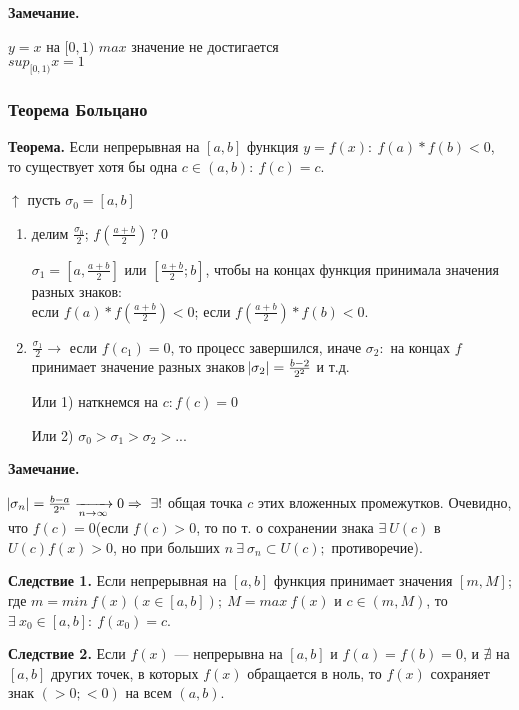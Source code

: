 \documentclass{article}
\begin{document}
    \textbf{Замечание.} 

    \( y = x \) на \( [0, 1) \) \( max \) значение не достигается\\
    \( sup_{[0, 1)} x = 1 \)


    \subsubsection{Теорема Больцано}
    \textbf{Теорема.} Если непрерывная на \([a, b]\) функция \(y = f(x):\ f(a) * f(b) < 0\), то существует хотя бы одна \(c \in (a, b):\ f(c) = c\).

    \( \uparrow \) пусть \( \sigma_0 = [a, b] \)

    \begin{enumerate}
        \item делим \( \frac{\sigma_0}{2} \); \( f(\frac{a + b}{2})\ ?\ 0 \)
        
        \( \sigma_1 = [a, \frac{a + b}{2}] \) или \( [\frac{a + b}{2}; b] \), чтобы на концах функция принимала значения разных знаков:\\
        если \(f(a)*f(\frac{a+b}{2}) < 0\); если \(f(\frac{a+b}{2}) * f(b) < 0\).
        
        \item \( \frac{\sigma_1}{2} \rightarrow \) если \(f(c_1) = 0\), то процесс завершился, иначе \(\sigma_2:\) на концах \(f\) принимает значение разных знаков \( \abs{\sigma_2} = \frac{b - 2}{2^2} \) и т.д. 
        
        Или 1) наткнемся на \( c: f(c) = 0 \)
        
        Или 2) \( \sigma_0 > \sigma_1 > \sigma_2 > ... \)
    \end{enumerate}
    
    \textbf{Замечание.}

    \(\abs{\sigma_n} = \frac{b-a}{2^n} \xrightarrow[n \rightarrow \infty]{} 0 \Rightarrow\ \exists !\) общая точка \(c\) этих вложенных промежутков. Очевидно, что \(f(c) = 0\)(если \(f(c) > 0\), то по т. о сохранении знака \(\exists\ U(c)\) в \(U(c) f(x) > 0\), но при больших \(n\ \exists\ \sigma_n \subset U(c);\) противоречие).

    \textbf{Следствие 1.} Если непрерывная на \([a, b]\) функция принимает значения \([m, M]\); где \(m = min\ f(x)(x \in [a, b]);\ M = max\ f(x)\) и \(c \in (m, M)\), то \(\exists\ x_0 \in [a,b]:\ f(x_0) = c\).
    

    \textbf{Следствие 2.} Если \( f(x) \) --- непрерывна на \( [a, b] \) и \( f(a) = f(b) = 0 \), и \(\nexists\) на \( [a, b] \) других точек, в которых \( f(x) \) обращается в ноль, то \( f(x) \) сохраняет знак \( (>0; <0) \) на всем \( (a, b) \).
\end{document}
